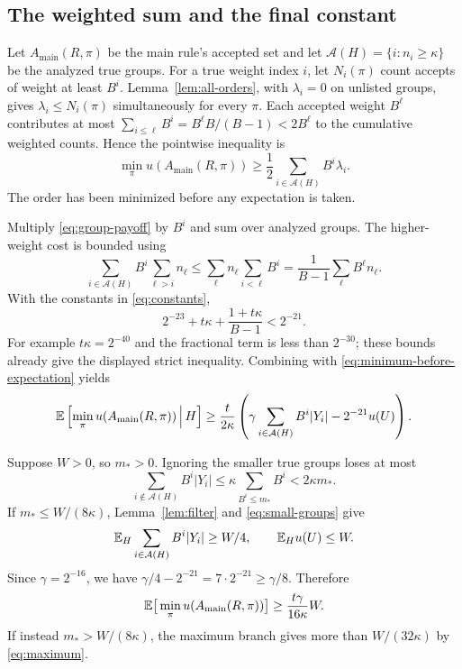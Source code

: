 \subsection{The weighted sum and the final constant}

Let $A_{\mathrm{main}}(R,\pi)$ be the main rule's accepted set and let
$\mathcal A(H)=\{i:n_i\ge\kappa\}$ be the analyzed true groups. For a true
weight index $i$, let $N_i(\pi)$ count accepts of weight at least $B^i$.
Lemma~\ref{lem:all-orders}, with $\lambda_i=0$ on unlisted groups, gives
$\lambda_i\le N_i(\pi)$ simultaneously for every $\pi$. Each accepted
weight $B^\ell$ contributes at most
$\sum_{i\le\ell}B^i=B^\ell B/(B-1)<2B^\ell$ to the cumulative weighted
counts. Hence the pointwise inequality is
\begin{equation}\label{eq:minimum-before-expectation}
 \min_\pi u(A_{\mathrm{main}}(R,\pi))
       \ge\frac12\sum_{i\in\mathcal A(H)} B^i\lambda_i.
\end{equation}
The order has been minimized before any expectation is taken.

Multiply \eqref{eq:group-payoff} by $B^i$ and sum over analyzed groups.
The higher-weight cost is bounded using
\[
 \sum_{i\in\mathcal A(H)}B^i\sum_{\ell>i}n_\ell
 \le\sum_\ell n_\ell\sum_{i<\ell}B^i
 =\frac1{B-1}\sum_\ell B^\ell n_\ell.
\]
With the constants in \eqref{eq:constants},
\begin{equation}\label{eq:error-constant}
 2^{-23}+t\kappa+\frac{1+t\kappa}{B-1}<2^{-21}.
\end{equation}
For example $t\kappa=2^{-40}$ and the fractional term is less than
$2^{-30}$; these bounds already give the displayed strict inequality.
Combining with \eqref{eq:minimum-before-expectation} yields
\begin{equation}\label{eq:conditional-main-payoff}
 \mathbb E\left[\min_\pi u(A_{\mathrm{main}}(R,\pi))\,\middle|\, H\right]
 \ge\frac{t}{2\kappa}\left(
       \gamma\sum_{i\in\mathcal A(H)}B^i|Y_i|-2^{-21}u(U)\right).
\end{equation}

Suppose $W>0$, so $m_*>0$. Ignoring the smaller true groups loses at most
\begin{equation}\label{eq:small-groups}
 \sum_{i\notin\mathcal A(H)}B^i|Y_i|
 \le\kappa\sum_{B^i\le m_*}B^i<2\kappa m_*.
\end{equation}
If $m_*\le W/(8\kappa)$, Lemma~\ref{lem:filter} and
\eqref{eq:small-groups} give
\[
 \mathbb E_H\sum_{i\in\mathcal A(H)}B^i|Y_i|\ge W/4,
 \qquad \mathbb E_H u(U)\le W.
\]
Since $\gamma=2^{-16}$, we have
$\gamma/4-2^{-21}=7\cdot2^{-21}\ge\gamma/8$. Therefore
\begin{equation}\label{eq:main-branch-guarantee}
 \mathbb E\big[\min_\pi u(A_{\mathrm{main}}(R,\pi))\big]
       \ge \frac{t\gamma}{16\kappa}W.
\end{equation}
If instead $m_*>W/(8\kappa)$, the maximum branch gives more than
$W/(32\kappa)$ by \eqref{eq:maximum}.

